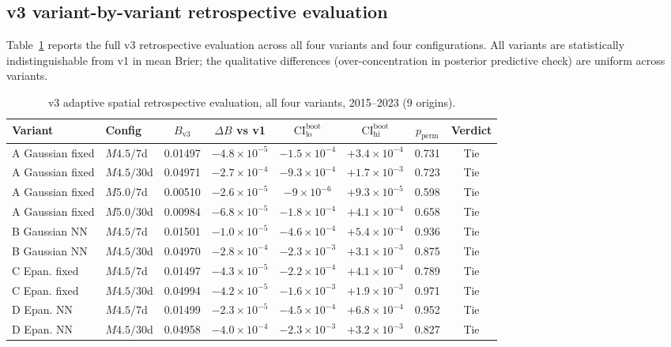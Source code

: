 \documentclass[10pt,a4paper,twocolumn]{article}
\begin{document}
\subsection{v3 variant-by-variant retrospective evaluation}

Table~\ref{tab:v3-all-variants} reports the full v3 retrospective evaluation across all four variants and four configurations. All variants are statistically indistinguishable from v1 in mean Brier; the qualitative differences (over-concentration in posterior predictive check) are uniform across variants.

\begin{table}[t]
\centering
\caption{v3 adaptive spatial retrospective evaluation, all four variants, 2015--2023 (9 origins).}\label{tab:v3-all-variants}
\small
\begin{tabular*}{\textwidth}{@{\extracolsep{\fill}}llcccccc}
\toprule
Variant & Config & $B_{\text{v3}}$ & $\Delta B$ vs v1 & $\text{CI}^{\text{boot}}_{\text{lo}}$ & $\text{CI}^{\text{boot}}_{\text{hi}}$ & $p_{\text{perm}}$ & Verdict \\
\midrule
A Gaussian fixed & $M4.5/7$d  & 0.01497 & $-4.8\times10^{-5}$ & $-1.5\times10^{-4}$ & $+3.4\times10^{-4}$ & 0.731 & Tie \\
A Gaussian fixed & $M4.5/30$d & 0.04971 & $-2.7\times10^{-4}$ & $-9.3\times10^{-4}$ & $+1.7\times10^{-3}$ & 0.723 & Tie \\
A Gaussian fixed & $M5.0/7$d  & 0.00510 & $-2.6\times10^{-5}$ & $-9\times10^{-6}$   & $+9.3\times10^{-5}$ & 0.598 & Tie \\
A Gaussian fixed & $M5.0/30$d & 0.00984 & $-6.8\times10^{-5}$ & $-1.8\times10^{-4}$ & $+4.1\times10^{-4}$ & 0.658 & Tie \\
B Gaussian NN    & $M4.5/7$d  & 0.01501 & $-1.0\times10^{-5}$ & $-4.6\times10^{-4}$ & $+5.4\times10^{-4}$ & 0.936 & Tie \\
B Gaussian NN    & $M4.5/30$d & 0.04970 & $-2.8\times10^{-4}$ & $-2.3\times10^{-3}$ & $+3.1\times10^{-3}$ & 0.875 & Tie \\
C Epan. fixed    & $M4.5/7$d  & 0.01497 & $-4.3\times10^{-5}$ & $-2.2\times10^{-4}$ & $+4.1\times10^{-4}$ & 0.789 & Tie \\
C Epan. fixed    & $M4.5/30$d & 0.04994 & $-4.2\times10^{-5}$ & $-1.6\times10^{-3}$ & $+1.9\times10^{-3}$ & 0.971 & Tie \\
D Epan. NN       & $M4.5/7$d  & 0.01499 & $-2.3\times10^{-5}$ & $-4.5\times10^{-4}$ & $+6.8\times10^{-4}$ & 0.952 & Tie \\
D Epan. NN       & $M4.5/30$d & 0.04958 & $-4.0\times10^{-4}$ & $-2.3\times10^{-3}$ & $+3.2\times10^{-3}$ & 0.827 & Tie \\
\bottomrule
\end{tabular*}
\end{table}
\end{document}
